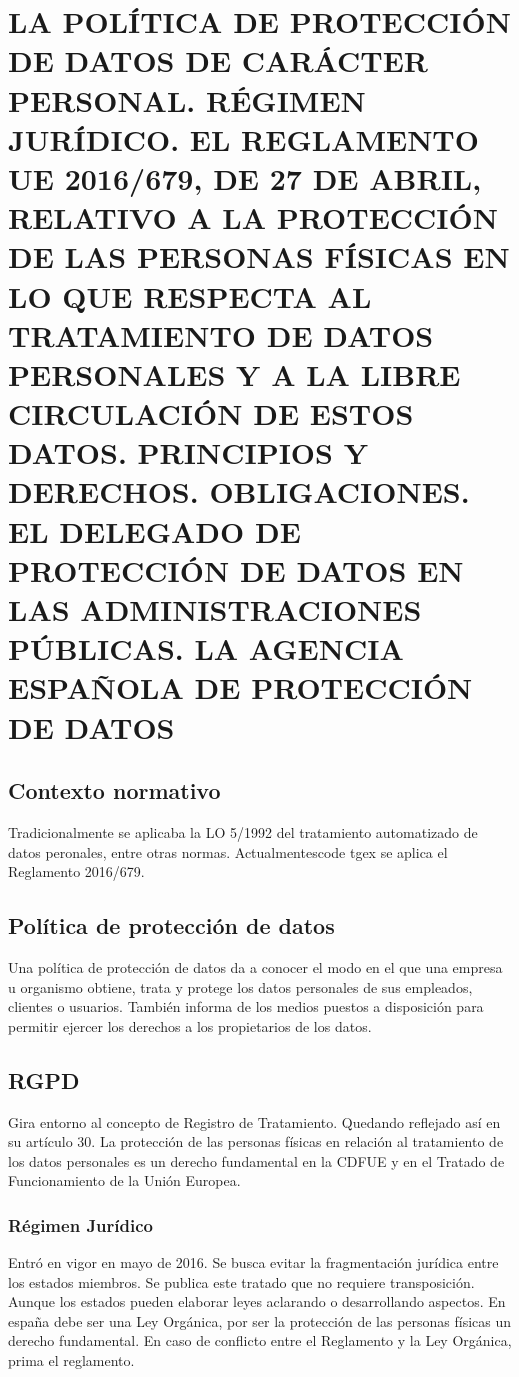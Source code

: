 \setcounter{section}{26}
\section{LA POLÍTICA DE PROTECCIÓN DE DATOS DE CARÁCTER PERSONAL. RÉGIMEN JURÍDICO. EL REGLAMENTO UE 2016/679, DE 27 DE ABRIL, RELATIVO A LA PROTECCIÓN DE LAS PERSONAS FÍSICAS EN LO QUE RESPECTA AL TRATAMIENTO DE DATOS PERSONALES Y A LA LIBRE CIRCULACIÓN DE ESTOS DATOS. PRINCIPIOS Y DERECHOS. OBLIGACIONES. EL DELEGADO DE PROTECCIÓN DE DATOS EN LAS ADMINISTRACIONES PÚBLICAS. LA AGENCIA ESPAÑOLA DE PROTECCIÓN DE DATOS}

\localtableofcontents

\subsection{Contexto normativo}
Tradicionalmente se aplicaba la LO 5/1992 del tratamiento automatizado de datos peronales, entre otras normas. Actualmentescode tgex se aplica el Reglamento 2016/679.


\subsection{Política de protección de datos}
Una política de protección de datos da a conocer el modo en el que una empresa u organismo obtiene, trata y protege los datos personales de sus empleados, clientes o usuarios. También informa de los medios puestos a disposición para permitir ejercer los derechos a los propietarios de los datos.

\subsection{RGPD}
    Gira entorno al concepto de Registro de Tratamiento. Quedando reflejado así en su artículo 30. La protección de las personas físicas en relación al tratamiento de los datos personales es un derecho fundamental en la CDFUE y en el Tratado de Funcionamiento de la Unión Europea. 

    \subsubsection{Régimen Jurídico}
        Entró en vigor en mayo de 2016. Se busca evitar la fragmentación jurídica entre los estados miembros. Se publica este tratado que no requiere transposición. Aunque los estados pueden elaborar leyes aclarando o desarrollando aspectos. En españa debe ser una Ley Orgánica, por ser la protección de las personas físicas un derecho fundamental. En caso de conflicto entre el Reglamento y la Ley Orgánica, prima el reglamento.

